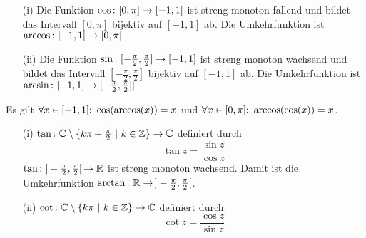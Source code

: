 \begin{framedthm}
	\begin{enumerate}
		\item[(i)] Die Funktion $\cos{:}\  [0,\pi] \to [-1,1]$ ist streng monoton fallend und bildet das Intervall $[0,\pi]$ bijektiv auf $[-1,1]$ ab. Die Umkehrfunktion ist \\$\arccos{:}\  [-1,1] \to [0,\pi]$
		\item[(ii)] Die Funktion $\sin{:}\  [-\frac{\pi}{2},\frac{\pi}{2}] \to [-1,1]$ ist streng monoton wachsend und bildet das Intervall $[-\frac{\pi}{2},\frac{\pi}{2}]$ bijektiv auf $[-1,1]$ ab. Die Umkehrfunktion ist \\$\arcsin{:}\  [-1,1] \to [-\frac{\pi}{2},\frac{\pi}{2}]]$
	\end{enumerate}
\end{framedthm}

\begin{framedquest}
	Es gilt $\forall x \in [-1,1]{:}\  \cos(\arccos(x)) = x$ und $\forall x \in [0,\pi]{:}\  \arccos(\cos(x)) = x$.
\end{framedquest}

\begin{frameddefn}[Tangens]
	\begin{enumerate}
		\item [(i)] $\tan {:}\  \mathbb{C} \setminus \{k\pi + \frac{\pi}{2} \ |\ k \in \mathbb{Z}\} \to \mathbb{C}$ definiert durch 
		\[
		\tan z = \frac{\sin z}{\cos z}
		\]
		$\tan{:}\  ]-\frac{\pi}{2}, \frac{\pi}{2}[ \,\to \mathbb{R}$ ist streng monoton wachsend. Damit ist die Umkehrfunktion $\arctan{:}\  \mathbb{R} \to\, ]-\frac{\pi}{2}, \frac{\pi}{2}[$.
		\item [(ii)] $\cot {:}\  \mathbb{C} \setminus \{k\pi \ |\ k \in \mathbb{Z}\} \to \mathbb{C}$ definiert durch
		\[
		\cot z = \frac{\cos z}{\sin z}
		\]
	\end{enumerate}
\end{frameddefn}